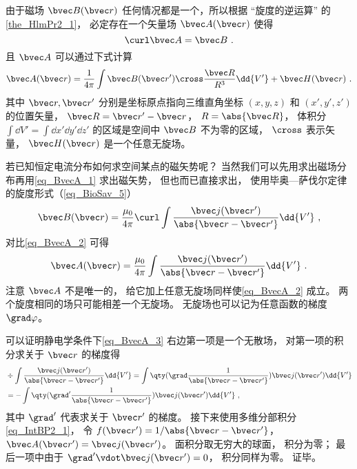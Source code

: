 
\begin{issues}
\issueDraft
{}
\end{issues}


由于磁场 $\bvec B(\bvec r)$ 任何情况都是一个，所以根据 “旋度的逆运算” 的\autoref{the_HlmPr2_1}， 必定存在一个矢量场 $\bvec A(\bvec r)$ 使得
\begin{equation}\label{eq_BvecA_2}
\curl \bvec A = \bvec B~.
\end{equation}
且 $\bvec A$ 可以通过下式计算
\begin{equation}\label{eq_BvecA_1}
\bvec A(\bvec r) = \frac{1}{4\pi} \int \bvec B(\bvec r') \cross \frac{\bvec R}{R^3} \dd{V'} + \bvec H(\bvec r)~.
\end{equation}
其中 $\bvec r, \bvec r'$ 分别是坐标原点指向三维直角坐标 $(x, y, z)$ 和 $(x', y', z')$ 的位置矢量， $\bvec R = \bvec r' - \bvec r$， $R = \abs{\bvec R}$， 体积分 $\int\dd{V'} = \int\dd{x'}\dd{y'}\dd{z'}$ 的区域是空间中 $\bvec B$ 不为零的区域， $\cross$ 表示矢量， $\bvec H(\bvec r)$ 是一个任意无旋场。

若已知恒定电流分布如何求空间某点的磁矢势呢？ 当然我们可以先用求出磁场分布再用\autoref{eq_BvecA_1} 求出磁矢势， 但也而已直接求出， 使用毕奥—萨伐尔定律的旋度形式（\autoref{eq_BioSav_5}）
\begin{equation}
\bvec B(\bvec r) = \frac{\mu_0}{4\pi} \curl \int \frac{\bvec j(\bvec r')}{\abs{\bvec r - \bvec r'}}\dd{V'}~,
\end{equation}
对比\autoref{eq_BvecA_2} 可得
\begin{equation}\label{eq_BvecA_3}
\bvec A(\bvec r) = \frac{\mu_0}{4\pi} \int \frac{\bvec j(\bvec r')}{\abs{\bvec r - \bvec r'}}\dd{V'}~.
\end{equation}
注意 $\bvec A$ 不是唯一的， 给它加上任意无旋场同样使\autoref{eq_BvecA_2} 成立。 两个旋度相同的场只可能相差一个无旋场。 无旋场也可以记为任意函数的梯度 $\grad \varphi$。

可以证明静电学条件下\autoref{eq_BvecA_3} 右边第一项是一个无散场， 对第一项的积分求关于 $\bvec r$ 的梯度得
\begin{equation}
\begin{aligned}
&\div \int \frac{\bvec j(\bvec r')}{\abs{\bvec r - \bvec r'}}\dd{V'} = 
\int \qty(\grad\frac{1}{\abs{\bvec r - \bvec r'}}) \bvec j(\bvec r') \dd{V'}\\
&= -\int \qty(\grad' \frac{1}{\abs{\bvec r - \bvec r'}}) \bvec j(\bvec r') \dd{V'}~,
\end{aligned}
\end{equation}
其中 $\grad'$ 代表求关于 $\bvec r'$ 的梯度。 接下来使用多维分部积分\autoref{eq_IntBP2_1}， 令 $f(\bvec r') = 1/\abs{\bvec r - \bvec r'}$， $\bvec A(\bvec r') = \bvec j(\bvec r')$。 面积分取无穷大的球面， 积分为零； 最后一项中由于 $\grad' \vdot \bvec j(\bvec r') = 0$， 积分同样为零。 证毕。

